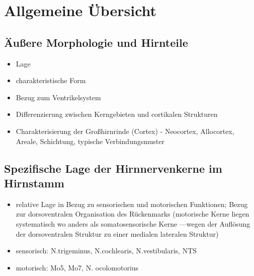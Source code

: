 \documentclass[12pt,a4paper,pdftex]{article}
\begin{document}
\newpage
\section{Allgemeine Übersicht}
\subsection{Äußere Morphologie und Hirnteile}

\begin{itemize}
    \item Lage
    \item charakteristische Form
    \item Bezug zum Ventrikelsystem
    \item Differenzierung zwischen Kerngebieten und cortikalen Strukturen
    \item Charakterisierung der Großhirnrinde (Cortex) - Neocortex, Allocortex, Areale, Schichtung, typische Verbindungsmuster
\end{itemize}
\subsection{Spezifische Lage der Hirnnervenkerne im Hirnstamm}
\begin{itemize}
    \item relative Lage in Bezug zu sensorischen und motorischen Funktionen; Bezug zur dorsoventralen Organisation des Rückenmarks  
    (motorische Kerne liegen systematisch  wo anders als somatosensorische Kerne ---wegen der Auflösung der dorsoventralen Struktur zu einer medialen lateralen Struktur) 
    \item sensorisch: N.trigeminus, N.cochlearis, N.vestibularis, NTS
    \item motorisch: Mo5, Mo7, N. ocolomotorius
\end{itemize}

\newpage
\end{document}

